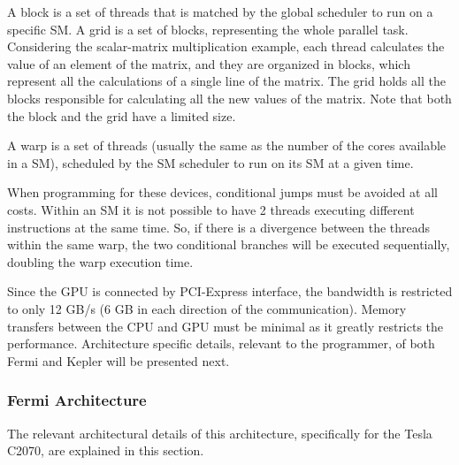 A block is a set of \cuda threads that is matched by the global scheduler to run on a specific SM. A grid is a set of blocks, representing the whole parallel task. Considering the scalar-matrix multiplication example, each \cuda thread calculates the value of an element of the matrix, and they are organized in blocks, which represent all the calculations of a single line of the matrix. The grid holds all the blocks responsible for calculating all the new values of the matrix. Note that both the block and the grid have a limited size.

A warp is a set of \cuda threads (usually the same as the number of the \cuda cores available in a SM), scheduled by the SM scheduler to run on its SM at a given time.

When programming for these devices, conditional jumps must be avoided at all costs. Within an SM it is not possible to have 2 threads executing different instructions at the same time. So, if there is a divergence between the threads within the same warp, the two conditional branches will be executed sequentially, doubling the warp execution time.

Since the GPU is connected by PCI-Express interface, the bandwidth is restricted to only 12 GB/s (6 GB in each direction of the communication). Memory transfers between the CPU and GPU must be minimal as it greatly restricts the performance.
Architecture specific details, relevant to the programmer, of both Fermi and Kepler will be presented next.

\subsubsection{\nvidia Fermi Architecture}

The relevant architectural details of this architecture, specifically for the Tesla C2070, are explained in this section.

